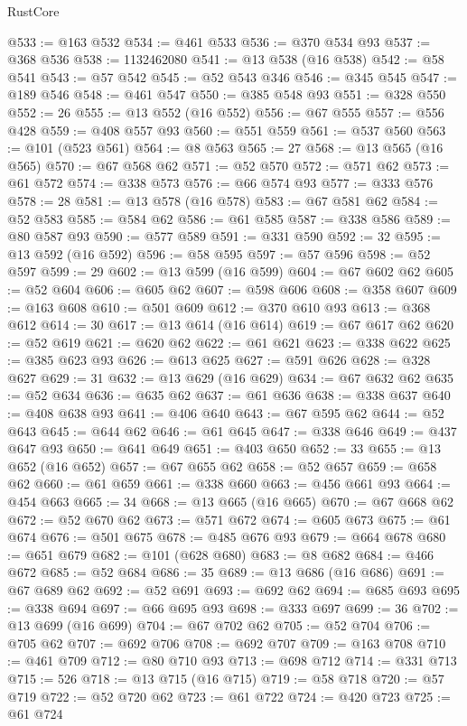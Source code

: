 \begin{lexlean}{RustCore}
\begin{coremodule}
@533 := @163 @532
@534 := @461 @533
@536 := @370 @534 @93
@537 := @368 @536
@538 := 1132462080
@541 := @13 @538 (@16 @538)
@542 := @58 @541
@543 := @57 @542
@545 := @52 @543 @346
@546 := @345 @545
@547 := @189 @546
@548 := @461 @547
@550 := @385 @548 @93
@551 := @328 @550
@552 := 26
@555 := @13 @552 (@16 @552)
@556 := @67 @555
@557 := @556 @428
@559 := @408 @557 @93
@560 := @551 @559
@561 := @537 @560
@563 := @101 (@523 @561)
@564 := @8 @563
@565 := 27
@568 := @13 @565 (@16 @565)
@570 := @67 @568 @62
@571 := @52 @570
@572 := @571 @62
@573 := @61 @572
@574 := @338 @573
@576 := @66 @574 @93
@577 := @333 @576
@578 := 28
@581 := @13 @578 (@16 @578)
@583 := @67 @581 @62
@584 := @52 @583
@585 := @584 @62
@586 := @61 @585
@587 := @338 @586
@589 := @80 @587 @93
@590 := @577 @589
@591 := @331 @590
@592 := 32
@595 := @13 @592 (@16 @592)
@596 := @58 @595
@597 := @57 @596
@598 := @52 @597
@599 := 29
@602 := @13 @599 (@16 @599)
@604 := @67 @602 @62
@605 := @52 @604
@606 := @605 @62
@607 := @598 @606
@608 := @358 @607
@609 := @163 @608
@610 := @501 @609
@612 := @370 @610 @93
@613 := @368 @612
@614 := 30
@617 := @13 @614 (@16 @614)
@619 := @67 @617 @62
@620 := @52 @619
@621 := @620 @62
@622 := @61 @621
@623 := @338 @622
@625 := @385 @623 @93
@626 := @613 @625
@627 := @591 @626
@628 := @328 @627
@629 := 31
@632 := @13 @629 (@16 @629)
@634 := @67 @632 @62
@635 := @52 @634
@636 := @635 @62
@637 := @61 @636
@638 := @338 @637
@640 := @408 @638 @93
@641 := @406 @640
@643 := @67 @595 @62
@644 := @52 @643
@645 := @644 @62
@646 := @61 @645
@647 := @338 @646
@649 := @437 @647 @93
@650 := @641 @649
@651 := @403 @650
@652 := 33
@655 := @13 @652 (@16 @652)
@657 := @67 @655 @62
@658 := @52 @657
@659 := @658 @62
@660 := @61 @659
@661 := @338 @660
@663 := @456 @661 @93
@664 := @454 @663
@665 := 34
@668 := @13 @665 (@16 @665)
@670 := @67 @668 @62
@672 := @52 @670 @62
@673 := @571 @672
@674 := @605 @673
@675 := @61 @674
@676 := @501 @675
@678 := @485 @676 @93
@679 := @664 @678
@680 := @651 @679
@682 := @101 (@628 @680)
@683 := @8 @682
@684 := @466 @672
@685 := @52 @684
@686 := 35
@689 := @13 @686 (@16 @686)
@691 := @67 @689 @62
@692 := @52 @691
@693 := @692 @62
@694 := @685 @693
@695 := @338 @694
@697 := @66 @695 @93
@698 := @333 @697
@699 := 36
@702 := @13 @699 (@16 @699)
@704 := @67 @702 @62
@705 := @52 @704
@706 := @705 @62
@707 := @692 @706
@708 := @692 @707
@709 := @163 @708
@710 := @461 @709
@712 := @80 @710 @93
@713 := @698 @712
@714 := @331 @713
@715 := 526
@718 := @13 @715 (@16 @715)
@719 := @58 @718
@720 := @57 @719
@722 := @52 @720 @62
@723 := @61 @722
@724 := @420 @723
@725 := @61 @724

\end{coremodule}
\end{lexlean}
